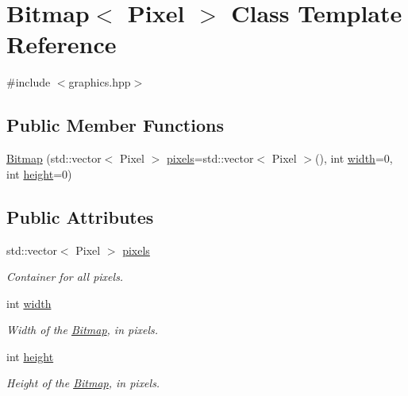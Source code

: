 \hypertarget{class_bitmap}{}\section{Bitmap$<$ Pixel $>$ Class Template Reference}
\label{class_bitmap}


{\ttfamily \#include $<$graphics.\+hpp$>$}

\subsection*{Public Member Functions}
\begin{DoxyCompactItemize}
\item 
\mbox{\hyperlink{class_bitmap_a58c9612034bf712ac71d92951c950ff5}{Bitmap}} (std\+::vector$<$ Pixel $>$ \mbox{\hyperlink{class_bitmap_acd003dbe23a69571311e6be4149eca51}{pixels}}=std\+::vector$<$ Pixel $>$(), int \mbox{\hyperlink{class_bitmap_a8733772b70b8971d11e3eb4eec6970a0}{width}}=0, int \mbox{\hyperlink{class_bitmap_a307fcc931419962f442ea32139e75a0b}{height}}=0)
\end{DoxyCompactItemize}
\subsection*{Public Attributes}
\begin{DoxyCompactItemize}
\item 
\mbox{\label{class_bitmap_acd003dbe23a69571311e6be4149eca51}} 
std\+::vector$<$ Pixel $>$ \mbox{\hyperlink{class_bitmap_acd003dbe23a69571311e6be4149eca51}{pixels}}
\begin{DoxyCompactList}\small\item\em Container for all pixels. \end{DoxyCompactList}\item 
\mbox{\label{class_bitmap_a8733772b70b8971d11e3eb4eec6970a0}} 
int \mbox{\hyperlink{class_bitmap_a8733772b70b8971d11e3eb4eec6970a0}{width}}
\begin{DoxyCompactList}\small\item\em Width of the \mbox{\hyperlink{class_bitmap}{Bitmap}}, in pixels. \end{DoxyCompactList}\item 
\mbox{\label{class_bitmap_a307fcc931419962f442ea32139e75a0b}} 
int \mbox{\hyperlink{class_bitmap_a307fcc931419962f442ea32139e75a0b}{height}}
\begin{DoxyCompactList}\small\item\em Height of the \mbox{\hyperlink{class_bitmap}{Bitmap}}, in pixels. \end{DoxyCompactList}\end{DoxyCompactItemize}


